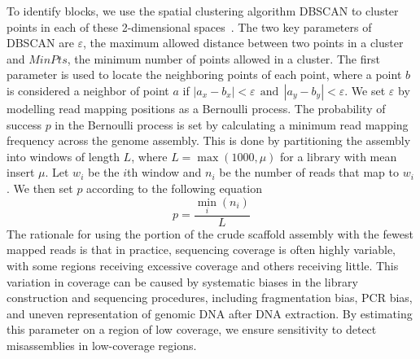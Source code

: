 \documentclass[10pt]{article}
\begin{document}
To identify blocks, we use the spatial clustering algorithm DBSCAN 
to cluster points in each of these 2-dimensional spaces~\cite{DBSCAN}. The two key parameters of DBSCAN are $\varepsilon$, the maximum allowed
distance between two points in a cluster and $MinPts$, the minimum number of points allowed in a cluster. The first parameter is used to locate 
the neighboring points of each point, where a point $b$ is considered a neighbor of point $a$ if $|a_x - b_x| < \varepsilon 
~~\mbox{and}~~ |a_y - b_y| < \varepsilon$. We set $\varepsilon$ by modelling read mapping positions as a Bernoulli process. 
The probability of success $p$ in the Bernoulli process is set by calculating a minimum read mapping frequency across the genome assembly.
This is done by partitioning the assembly into windows of length $L$, where $L = \max(1000,\mu)$ for a library with mean insert $\mu$. 
Let $w_i$ be the $i$th window and $n_i$ be the number of reads that map to $w_i$. We then set $p$ according to the following equation
\begin{equation}
	p = \dfrac{\min_{i}(n_i)}{L}
\end{equation}
The rationale for using the portion of the crude scaffold assembly with the fewest mapped reads is that in practice, sequencing
coverage is often highly variable, with some regions receiving excessive coverage and others receiving little. This variation
in coverage can be caused by systematic biases in the library construction and sequencing procedures, including fragmentation bias,
PCR bias, and uneven representation of genomic DNA after DNA extraction. By estimating this parameter on a region of low
coverage, we ensure sensitivity to detect misassemblies in low-coverage regions.
\end{document}
